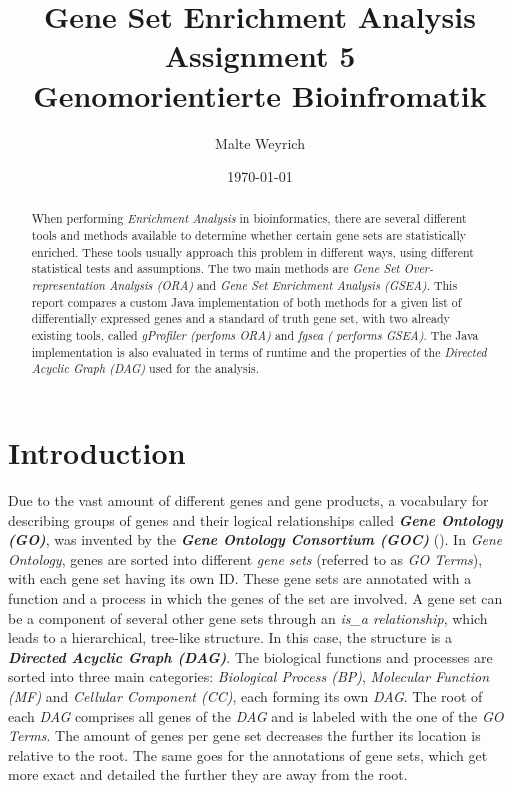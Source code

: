 \documentclass[12pt]{article}
\title{Gene Set Enrichment Analysis \\Assignment 5\\ Genomorientierte Bioinfromatik}
\author{Malte Weyrich}
\date{\today}
\begin{document}
\maketitle

\tableofcontents
\begin{abstract}
When performing \textit{Enrichment Analysis} in bioinformatics, there are several different tools and methods available to determine whether certain gene sets are statistically enriched. 
These tools usually approach this problem in different ways, using different statistical tests and assumptions.
The two main methods are \textit{Gene Set Over-representation Analysis (ORA)} and \textit{Gene Set Enrichment Analysis (GSEA)}.
This report compares a custom Java implementation of both methods for a given list of differentially expressed genes and a standard of truth gene set,
with two already existing tools, called \textit{gProfiler (perfoms ORA)} and \textit{fgsea ( performs GSEA)}.
The Java implementation is also evaluated in terms of runtime and the properties of the \textit{Directed Acyclic Graph (DAG)} used for the analysis.


\end{abstract}

\newpage



\section{Introduction}\label{sec:Introduction}
Due to the vast amount of different genes and gene products, a vocabulary for describing
groups of genes and their logical relationships called \textit{\textbf{Gene Ontology
(GO)}}, was invented by the \textit{\textbf{Gene Ontology Consortium (GOC)}} (\cite{Ashburner2000}).
In \textit{Gene Ontology}, genes are sorted into different \textit{gene sets} (referred
to as \textit{GO Terms}), with each gene set having its own ID.
These gene sets are annotated with a function and a process
in which the genes of the set are involved. A gene set can be a component of several
other gene sets through an \textit{is\_a relationship}, which leads to a hierarchical,
tree-like structure. In this case, the structure is a \textit{\textbf{Directed Acyclic
Graph (DAG)}}. The biological functions and processes are sorted into three main categories:
\textit{Biological Process (BP)}, \textit{Molecular Function (MF)} and \textit{Cellular
Component (CC)}, each forming its own \textit{DAG}. The root of each \textit{DAG}
comprises all genes of the \textit{DAG} and is labeled with the one of the \textit{GO
Terms}. The amount of genes per gene set decreases the further its location is
relative to the root. The same goes for the annotations of gene sets, which get more exact
and detailed the further they are away from the root. 
\end{document}
